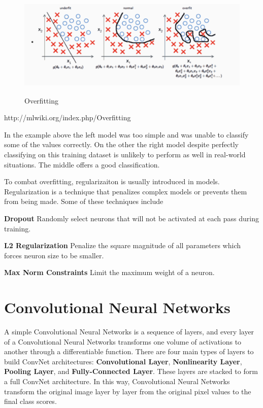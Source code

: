 \documentclass[twoside]{article}
\begin{document}
\begin{figure}[!htb]
\centering
\includegraphics[height = 2in]{pics/overfitting.png}
\caption{Overfitting\cite{}}
\label{fig:Overfitting}
\end{figure}
http://mlwiki.org/index.php/Overfitting

In the example above the left model was too simple and was unable to classify some of the values correctly. On the other the right model despite perfectly classifying on this training dataset is unlikely to perform as well in real-world situations. The middle offers a good classification.

To combat overfitting, regularizaiton is usually introduced in models. Regularization is a technique that penalizes complex models or prevents them from being made. Some of these techniques include

\textbf{Dropout}
Randomly select neurons that will not be activated at each pass during training.

\textbf{L2 Regularization}
Penalize the square magnitude of all parameters which forces neuron size to be smaller.

\textbf{Max Norm Constraints}
Limit the maximum weight of a neuron.


\section{Convolutional Neural Networks}
A simple Convolutional Neural Networks is a sequence of layers, and every layer of a Convolutional Neural Networks transforms one volume of activations to another through a differentiable function. There are four main types of layers to build ConvNet architectures: \textbf{Convolutional Layer}, \textbf{Nonlinearity Layer}, \textbf{Pooling Layer}, and \textbf{Fully-Connected Layer}. These layers are stacked to form a full ConvNet architecture. In this way, Convolutional Neural Networks transform the original image layer by layer from the original pixel values to the final class scores.
\end{document}

